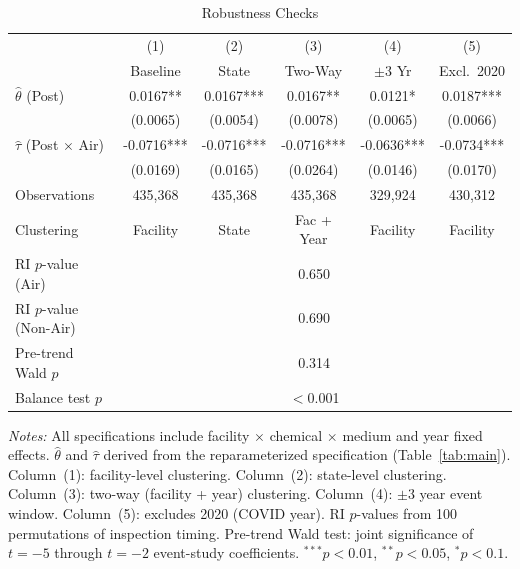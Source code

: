 \begin{table}[htbp]
\centering
\caption{Robustness Checks}
\label{tab:robust}
\begin{tabular}{lccccc}
\toprule
& (1) & (2) & (3) & (4) & (5) \\
& Baseline & State & Two-Way & $\pm 3$ Yr & Excl.\ 2020 \\
\midrule
$\hat{\theta}$ (Post) & 0.0167** & 0.0167*** & 0.0167** & 0.0121* & 0.0187*** \\
& (0.0065) & (0.0054) & (0.0078) & (0.0065) & (0.0066) \\[6pt]
$\hat{\tau}$ (Post $\times$ Air) & -0.0716*** & -0.0716*** & -0.0716*** & -0.0636*** & -0.0734*** \\
& (0.0169) & (0.0165) & (0.0264) & (0.0146) & (0.0170) \\[6pt]
\midrule
Observations & 435,368 & 435,368 & 435,368 & 329,924 & 430,312 \\
Clustering & Facility & State & Fac + Year & Facility & Facility \\
\midrule
RI $p$-value (Air) & \multicolumn{5}{c}{0.650} \\
RI $p$-value (Non-Air) & \multicolumn{5}{c}{0.690} \\
Pre-trend Wald $p$ & \multicolumn{5}{c}{0.314} \\
Balance test $p$ & \multicolumn{5}{c}{$<$0.001} \\
\bottomrule
\end{tabular}
\begin{minipage}{0.95\textwidth}
\vspace{0.3em}
\footnotesize \textit{Notes:} All specifications include facility $\times$ chemical $\times$ medium and year fixed effects. $\hat{\theta}$ and $\hat{\tau}$ derived from the reparameterized specification (Table~\ref{tab:main}). Column~(1): facility-level clustering. Column~(2): state-level clustering. Column~(3): two-way (facility + year) clustering. Column~(4): $\pm 3$ year event window. Column~(5): excludes 2020 (COVID year). RI $p$-values from 100 permutations of inspection timing. Pre-trend Wald test: joint significance of $t = -5$ through $t = -2$ event-study coefficients. $^{***}p<0.01$, $^{**}p<0.05$, $^{*}p<0.1$.
\end{minipage}
\end{table}
